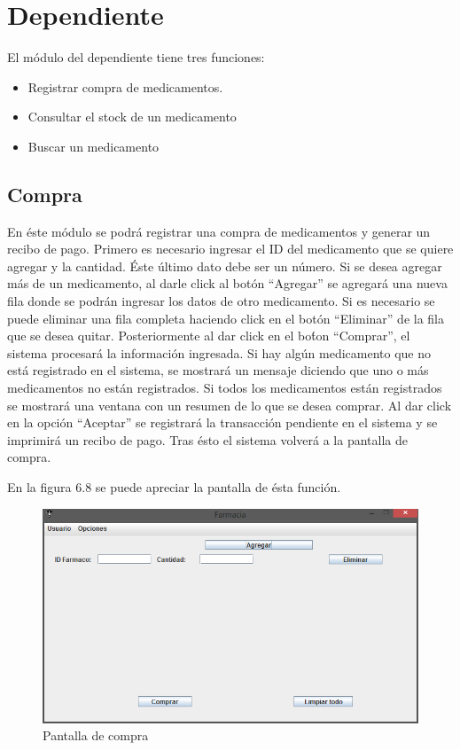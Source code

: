 \section{Dependiente}
El m\'odulo del dependiente tiene tres funciones: 
\begin{itemize}
\item Registrar compra de medicamentos.
\item Consultar el stock de un medicamento
\item Buscar un medicamento
\end{itemize}

\subsection{Compra}
En \'este m\'odulo se podr\'a registrar una compra de medicamentos y generar un recibo de pago.
Primero es necesario ingresar el ID del medicamento que se quiere agregar y la cantidad. \'Este \'ultimo dato debe ser un n\'umero. Si se desea agregar m\'as de un medicamento, al darle click al bot\'on "`Agregar"' se agregar\'a una nueva fila donde se podr\'an ingresar los datos de otro medicamento. Si es necesario se puede eliminar una fila completa haciendo click en el bot\'on "`Eliminar"' de la fila que se desea quitar. Posteriormente al dar click en el bo\'ton "`Comprar"', el sistema procesar\'a la informaci\'on ingresada.
Si hay alg\'un medicamento que no est\'a registrado en el sistema, se mostrar\'a un mensaje diciendo que uno o m\'as medicamentos no est\'an registrados. Si todos los medicamentos est\'an registrados se mostrar\'a una ventana con un resumen de lo que se desea comprar. Al dar click en la opci\'on "`Aceptar"' se registrar\'a la transacci\'on pendiente en el sistema y se imprimir\'a un recibo de pago. Tras \'esto el sistema volver\'a a la pantalla de compra.

En la figura 6.8 se puede apreciar la pantalla de \'esta funci\'on.
\begin{figure}[htbp!]
		\centering		
	\end{figure}
\begin{figure}[htbp!]
\centering
		\includegraphics[width=.7\textwidth]{images/gui/IUCompra}
		\caption{Pantalla de compra}
\end{figure}


